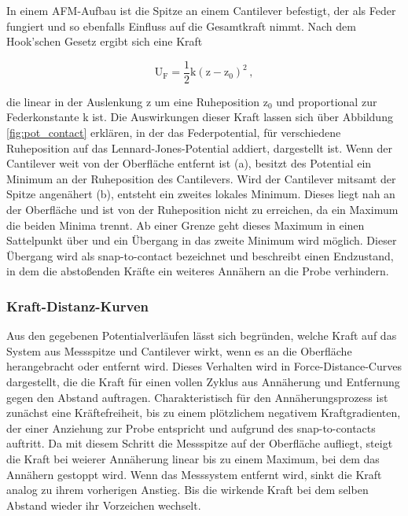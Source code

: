           \FloatBarrier

          In einem AFM-Aufbau ist die Spitze an einem Cantilever befestigt, der als Feder fungiert und so ebenfalls Einfluss auf die Gesamtkraft nimmt. Nach dem Hook'schen Gesetz ergibt sich eine Kraft 
          
          \begin{equation*}
            \text{U}_{\text{F}} = \frac{1}{2} \text{k} \left(\text{z} - \text{z}_0\right)^2 \, ,
          \end{equation*}
          
          die linear in der Auslenkung z um eine Ruheposition z$_0$ und proportional zur Federkonstante k ist. Die Auswirkungen dieser Kraft lassen sich über Abbildung \ref{fig:pot_contact} erklären, in der 
          das Federpotential, für verschiedene Ruheposition auf das Lennard-Jones-Potential addiert, dargestellt ist. Wenn der Cantilever weit von der Oberfläche entfernt ist (a), besitzt des Potential ein 
          Minimum an der Ruheposition des Cantilevers. Wird der Cantilever mitsamt der Spitze angenähert (b), entsteht ein zweites lokales Minimum. Dieses liegt nah an der Oberfläche und ist von der Ruheposition
          nicht zu erreichen, da ein Maximum die beiden Minima trennt. Ab einer Grenze geht dieses Maximum in einen Sattelpunkt über und ein Übergang in das zweite Minimum wird möglich. Dieser Übergang wird als
          snap-to-contact bezeichnet und beschreibt einen Endzustand, in dem die abstoßenden Kräfte ein weiteres Annähern an die Probe verhindern. 





        \subsubsection{Kraft-Distanz-Kurven}

          Aus den gegebenen Potentialverläufen lässt sich begründen, welche Kraft auf das System aus Messspitze und Cantilever wirkt, wenn es an die Oberfläche herangebracht oder entfernt wird. Dieses Verhalten
          wird in Force-Distance-Curves dargestellt, die die Kraft für einen vollen Zyklus aus Annäherung und Entfernung gegen den Abstand auftragen. Charakteristisch für den Annäherungsprozess ist zunächst
          eine Kräftefreiheit, bis zu einem plötzlichem negativem Kraftgradienten, der einer Anziehung zur Probe entspricht und aufgrund des snap-to-contacts auftritt. Da mit diesem Schritt die Messspitze auf 
          der Oberfläche aufliegt, steigt die Kraft bei weierer Annäherung linear bis zu einem Maximum, bei dem das Annähern gestoppt wird. Wenn das Messsystem entfernt wird, sinkt die Kraft analog zu ihrem 
          vorherigen Anstieg. Bis die wirkende Kraft bei dem selben Abstand wieder ihr Vorzeichen wechselt.


